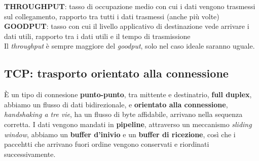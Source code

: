 \textbf{THROUGHPUT}: tasso di occupazione medio con cui i dati vengono trasmessi sul collegamento, rapporto tra tutti i dati trasmessi (anche più volte) \\
\textbf{GOODPUT}: tasso con cui il livello applicativo di destinazione vede arrivare i dati utili, rapporto tra i dati utili e il tempo di trasmissione \\
Il \textit{throughput} è sempre maggiore del \textit{goodput}, solo nel caso ideale saranno uguale. 

\subsection{TCP: trasporto orientato alla connessione}
È un tipo di connesione \textbf{punto-punto}, tra mittente e destinatrio, \textbf{full duplex}, abbiamo un flusso di dati bidirezionale, e \textbf{orientato alla connessione}, \textit{handshaking a tre vie}, ha un flusso di byte affidabile, arrivano nella sequenza corretta. 
I dati vengono mandati in \textbf{pipeline}, attraverso un meccanismo \textit{sliding window}, abbiamo un \textbf{buffer d'inivio} e un \textbf{buffer di ricezione}, così che i paccehtti che arrivano fuori ordine vengono conservati e riordinati successivamente. 

